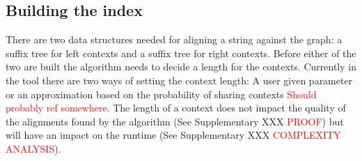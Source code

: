 \documentclass{article}
\begin{document}
\subsection{Building the index}
There are two data structures needed for aligning a string against the graph: a suffix tree for left contexts and a suffix tree for right contexts. Before either of the two are built the algorithm needs to decide a length for the contexts. Currently in the tool there are two ways of setting the context length: A user given parameter or an approximation based on the probability of sharing contexts \textcolor{red}{Should probably ref somewhere}. The length of a context does not impact the quality of the alignments found by the algorithm (See Supplementary XXX \textcolor{red}{PROOF}) but will have an impact on the runtime (See Supplementary XXX \textcolor{red}{COMPLEXITY ANALYSIS}).\\
\par\noindent
\end{document}
